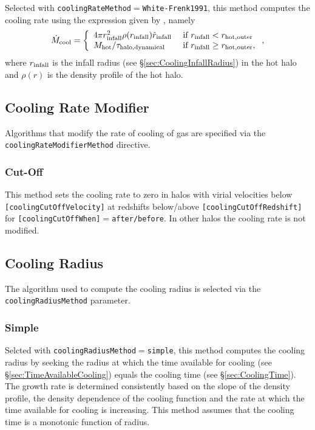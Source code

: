 Selected with {\tt coolingRateMethod}$=${\tt White-Frenk1991}, this method computes the cooling rate using the expression given by \cite{white_galaxy_1991}, namely
\begin{equation}
\dot{M}_{\rm cool} = \left\{ \begin{array}{ll} 4 \pi r_{\rm infall}^2 \rho(r_{\rm infall}) \dot{r}_{\rm infall}& \hbox{ if } r_{\rm infall} < r_{\rm hot, outer} \\ M_{\rm hot}/\tau_{\rm halo, dynamical} & \hbox{ if } r_{\rm infall} \ge r_{\rm hot, outer}, \end{array} \right. ,
\end{equation}
where $r_{\rm infall}$ is the infall radius (see \S\ref{sec:CoolingInfallRadius}) in the hot halo and $\rho(r)$ is the density profile of the hot halo.

\subsection{Cooling Rate Modifier}\label{sec:CoolingRateModifier}

Algorithms that modify the rate of cooling of gas are specified via the {\tt coolingRateModifierMethod} directive.

\subsubsection{Cut-Off}

This method sets the cooling rate to zero in halos with virial velocities below {\tt [coolingCutOffVelocity]} at redshifts below/above {\tt [coolingCutOffRedshift]} for {\tt [coolingCutOffWhen]}$=${\tt after/before}. In other halos the cooling rate is not modified.

\subsection{Cooling Radius}\label{sec:CoolingRadius}

The algorithm used to compute the cooling radius is selected via the {\tt coolingRadiusMethod} parameter.

\subsubsection{Simple}

Selcted with {\tt coolingRadiusMethod}$=${\tt simple}, this method computes the cooling radius by seeking the radius at which the time available for cooling (see \S\ref{sec:TimeAvailableCooling}) equals the cooling time (see \S\ref{sec:CoolingTime}). The growth rate is determined consistently based on the slope of the density profile, the density dependence of the cooling function and the rate at which the time available for cooling is increasing. This method assumes that the cooling time is a monotonic function of radius.

